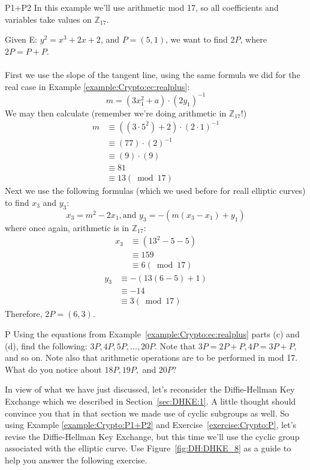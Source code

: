 \begin{example}{P1+P2} In this example we'll use arithmetic mod 17, so  all coefficients and variables take values on $\mathbb{Z}_{17}$.  

Given E: $y^2 = x^3 + 2x + 2$, and $P = (5,1)$,  we want to find $2P$, where $2P = P + P$.\\ \\
First we use the slope of the tangent line, using the same formula we did for the real case in Example \ref{example:Crypto:ec:realplus}:	
\[m = (3x_1^2 + a) \cdot (2y_1)^{-1}\]	
We may then calculate (remember we're doing arithmetic in  $\mathbb{Z}_{17}$!)
\begin{align*}
		m &\equiv ( (3 \cdot 5^2) + 2) \cdot (2 \cdot 1)^{-1} \\
	          &\equiv  (77) \cdot (2)^{-1} \\
                     &\equiv (9) \cdot (9)\\
                     &\equiv 81 \\
                    &\equiv 13 (\bmod 17)
		\end{align*}
Next we use the following formulas (which we used before for reall elliptic curves) to find $x_3$ and $y_3$: \[ x_3 = m^2 - 2x_1  , \text{and~} y_3 =-(  m(x_3 - x_1)+y_1)\]
where once again, arithmetic is in $\mathbb{Z}_{17}$:
\begin{align*}
		x_3 &\equiv  (13^2 - 5 - 5 ) \\
	          &\equiv 159\\
                     &\equiv 6 (\bmod 17)
		\end{align*}
			\begin{align*}
		y_3 &\equiv - (13(6 - 5) +1) \\
	          &\equiv -14\\
                     &\equiv 3 (\bmod 17)
		\end{align*}
Therefore, $2P = (6,3)$.
\end{example}
\begin{exercise}{P}
Using the equations from Example~\ref{example:Crypto:ec:realplus} parts (c) and (d), find the following: $3P, 4P, 5P, ..., 20P.$  Note that $3P = 2P + P,  4P = 3P +P,$ and so on. Note also that arithmetic operations are to be performed in mod 17.  What do you notice about $18P,  19P,$ and $20P?$
\end{exercise}
In view of what we have just discussed, let's reconsider the Diffie-Hellman Key Exchange which we described in Section~\ref{sec:DHKE:1}. A little thought should convince you that in that section we made use of cyclic subgroups as well. So using Example \ref{example:Crypto:P1+P2} and Exercise~\ref{exercise:Crypto:P}, let's revise the Diffie-Hellman Key Exchange, but this time we'll use the cyclic group associated with the elliptic curve.  Use Figure~\ref{fig:DH:DHKE_8} as a guide to help you answer the following exercise.

